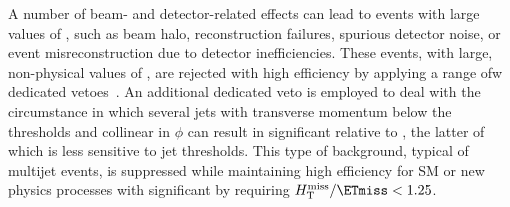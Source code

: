 A number of beam- and detector-related effects can lead to events with
large values of \ETmiss, such as beam halo, reconstruction failures,
spurious detector noise, or event misreconstruction due to detector
inefficiencies. These events, with large, non-physical values of
\ETmiss, are rejected with high efficiency by applying a range ofw
dedicated vetoes~\cite{RA1Paper2012, cms-met}. An additional dedicated
veto is employed to deal with the circumstance in which several jets
with transverse momentum below the \Pt thresholds and collinear in
$\phi$ can result in significant \mht relative to \ETmiss, the latter
of which is less sensitive to jet thresholds. This type of background,
typical of multijet events, is suppressed while maintaining high
efficiency for SM or new physics processes with significant \ptvecmiss
by requiring $\mht / \ETmiss < 1.25$.

